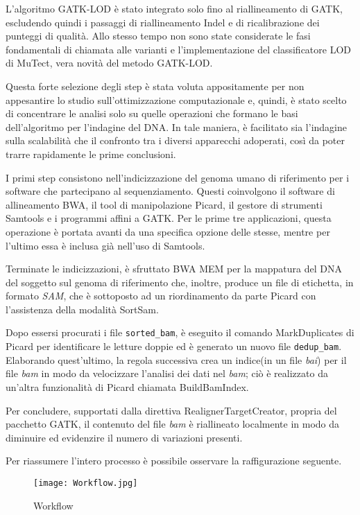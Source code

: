 L'algoritmo GATK-LOD è stato integrato solo fino al riallineamento di GATK, escludendo quindi i passaggi di riallineamento Indel e di ricalibrazione dei punteggi di qualità.
Allo stesso tempo non sono state considerate le fasi fondamentali di chiamata alle varianti e l'implementazione del classificatore LOD di MuTect, vera novità del metodo GATK-LOD.

Questa forte selezione degli step è stata voluta appositamente per non appesantire lo studio sull'ottimizzazione computazionale e, quindi, è stato scelto di concentrare le analisi solo su quelle operazioni che formano le basi dell'algoritmo per l'indagine del DNA.
In tale maniera, è facilitato sia l'indagine sulla scalabilità che il confronto tra i diversi apparecchi adoperati, così da poter trarre rapidamente le prime conclusioni.

I primi step consistono nell'indicizzazione del genoma umano di riferimento per i software che partecipano al sequenziamento.
Questi coinvolgono il software di allineamento BWA, il tool di manipolazione Picard, il gestore di strumenti Samtools e i programmi affini a GATK.
Per le prime tre  applicazioni, questa operazione è portata avanti da una specifica opzione delle stesse, mentre per l'ultimo essa è inclusa già nell'uso di Samtools.

Terminate le indicizzazioni, è sfruttato BWA MEM per la mappatura del DNA del soggetto sul genoma di riferimento che, inoltre, produce un file di etichetta, in formato \textit{SAM}, che è sottoposto ad un riordinamento da parte Picard con l'assistenza della modalità SortSam.

Dopo essersi procurati i file \verb!sorted_bam!, è eseguito il comando MarkDuplicates di Picard per identificare le letture doppie ed è generato un nuovo file \verb!dedup_bam!.
Elaborando quest'ultimo, la regola successiva crea un indice(in un file \textit{bai}) per il file \textit{bam} in modo da velocizzare l'analisi dei dati nel \textit{bam}; ciò è realizzato da un'altra funzionalità di Picard chiamata BuildBamIndex.

Per concludere, supportati dalla direttiva RealignerTargetCreator, propria del pacchetto GATK, il contenuto del file \textit{bam} è riallineato localmente in modo da diminuire ed evidenzire il numero di variazioni presenti.

Per riassumere l'intero processo è possibile osservare la raffigurazione seguente.
\begin{figure}[H]
\centering
\texttt{[image: Workflow.jpg]}
\caption{Workflow}
\label{fig:workflow}
\end{figure}




